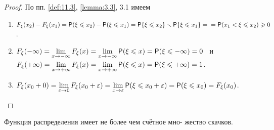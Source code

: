 \begin{proof}
	По пп. \ref{def:11.3}, \ref{lemma:3.3}, 3.1 имеем  
	\begin{enumerate}
		\item $F_{\xi}(x_2)-F_{\xi}(x_1)=\P(\xi\leqslant x_2)-\P(\xi\leqslant x_1)=
			\P\{\xi\leqslant x_2\}\ssm \P\{\xi\leqslant x_1\}= \\
			=\P(x_1<\xi\leqslant x_2)\geqslant 0$.
		
		\item $F_{\xi}(-\infty)=\lim\limits_{x\to-\infty}F_{\xi}(x)=\lim\limits_{x\to-\infty}\P(\xi\leqslant x)=\P(\xi\leqslant-\infty)=0$ \, и \,
		$F_{\xi}(+\infty)=\lim\limits_{x\to+\infty}F_{\xi}(x)=\lim\limits_{x\to+\infty}\P(\xi\leqslant x)=\P(\xi\leqslant+\infty)=1$.
		
		\item $F_{\xi}(x_0+0)=\lim\limits_{\varepsilon\to 0}F_{\xi}(x_0+\varepsilon)=\lim\limits_{x\to\varepsilon}\P(\xi\leqslant x_0+\varepsilon)=\P(\xi\leqslant x_0)=F_{\xi}(x_0)$.
		
	\end{enumerate}

\end{proof}

\begin{theorem}
\label{th:11.5}
	Функция распределения имеет не более чем счётное мно-
жество скачков.
\end{theorem}


